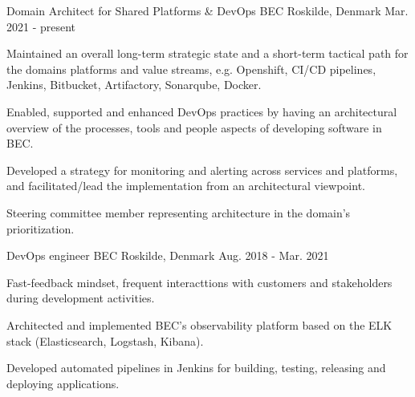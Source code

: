 


\begin{cventries}

\cventry
{Domain Architect for Shared Platforms \& DevOps} %
{BEC} %
{Roskilde, Denmark} %
{Mar. 2021 - present} %
{ %
\begin{cvitems}
\item{Maintained an overall long-term strategic state and a short-term tactical path for the domains platforms and value streams, e.g. Openshift, CI/CD pipelines, Jenkins, Bitbucket, Artifactory, Sonarqube, Docker.}
\item{Enabled, supported and enhanced DevOps practices by having an architectural overview of the processes, tools and people aspects of developing software in BEC.}
\item{Developed a strategy for monitoring and alerting across services and platforms, and facilitated/lead the implementation from an architectural viewpoint.}
\item{Steering committee member representing architecture in the domain's prioritization.}
\end{cvitems}
}
\cventry
{DevOps engineer} %
{BEC} %
{Roskilde, Denmark} %
{Aug. 2018 - Mar. 2021} %
{ %
\begin{cvitems}
\item{Fast-feedback mindset, frequent interacttions with customers and stakeholders during development activities.}
\item Architected and implemented BEC's observability platform based on the ELK stack (Elasticsearch, Logstash, Kibana).
\item Developed automated pipelines in Jenkins for building, testing, releasing and deploying applications.

\end{cvitems}}
\end{cventries}
